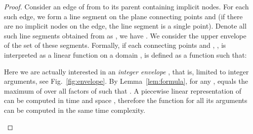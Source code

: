 \documentclass{article}
\theoremstyle{theorem}
\theoremstyle{definition}
\begin{document}
  \begin{proof}
    Consider an edge of  from  to its parent  containing  implicit nodes.
    For each such edge, we form a line segment on the plane connecting points
     and 
    (if there are no implicit nodes on the edge, the line segment is a single point).
    Denote all such line segments obtained from  as , we have .
    We consider the upper envelope  of the set of these segments.
    Formally, if each  connecting points  and , ,
    is interpreted as a linear function on a domain ,
     is defined as a function  such that:
    
    Here we are actually interested in an \emph{integer envelope} , that is, 
    limited to integer arguments, see Fig.~\ref{fig:envelope}.
    By Lemma~\ref{lem:formula}, for any ,
     equals the maximum of  over all factors  of 
    such that .
    A piecewise linear representation of  can be computed in  time and  space
    \cite{DBLP:journals/ipl/Hershberger89}, therefore the function  for all its arguments
    can be computed in the same time complexity.

    \begin{figure}[htb]
      \centering
\end{figure}
\end{proof}
\end{document}
